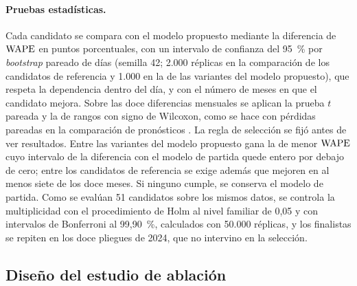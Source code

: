 \paragraph{Pruebas estadísticas.}
Cada candidato se compara con el modelo propuesto mediante la diferencia de $\mathrm{WAPE}$ en puntos porcentuales,
con un intervalo de confianza del 95~\% por \emph{bootstrap} pareado de días (semilla 42; 2.000 réplicas en
la comparación de los candidatos de referencia y 1.000 en la de las variantes del modelo propuesto), que
respeta la dependencia dentro del día, y con el número de meses en que el candidato mejora. Sobre las doce
diferencias mensuales se aplican la prueba $t$ pareada y la de rangos con signo de Wilcoxon, como se hace
con pérdidas pareadas en la comparación de pronósticos \citep{diebold1995}. La regla de selección se fijó
antes de ver resultados. Entre las variantes del modelo propuesto gana la de menor $\mathrm{WAPE}$ cuyo intervalo
de la diferencia con el modelo de partida quede entero por debajo de cero; entre los candidatos de
referencia se exige además que mejoren en al menos siete de los doce meses. Si ninguno cumple, se conserva
el modelo de partida. Como se evalúan 51 candidatos sobre los mismos datos, se controla la multiplicidad con
el procedimiento de Holm \citep{holm1979} al nivel familiar de 0,05 y con intervalos de Bonferroni al
99,90~\%, calculados con 50.000 réplicas, y los finalistas se repiten en los doce pliegues de 2024, que no
intervino en la selección.

\subsection{Diseño del estudio de ablación}
\label{sec:ablacion}

